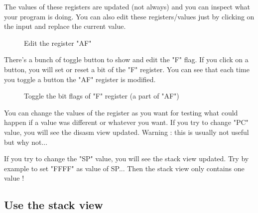 \documentclass[10pt]{report}
\begin{document}
The values of these registers are updated (not always) and you can inspect what your program is doing.\newline
You can also edit these registers/values just by clicking on the input and replace the current value.\newline
\begin{figure}[H]
\centering
{}
\caption{Edit the register "AF"}
\end{figure}

There's a bunch of toggle button to show and edit the "F" flag.\newline
If you click on a button, you will set or reset a bit of the "F" register.\newline
You can see that each time you toggle a button the "AF" register is modified.\newline
\begin{figure}[H]
\centering
{}
\caption{Toggle the bit flags of "F" register (a part of "AF")}
\end{figure}

You can change the values of the register as you want for testing what could happen if a value was different or whatever you want.\newline
If you try to change "PC" value, you will see the disasm view updated.\newline
Warning : this is usually not useful but why not...\newline

If you try to change the "SP" value, you will see the stack view updated.\newline
Try by example to set "FFFF" as value of SP... Then the stack view only contains one value !\newline

\subsection{Use the stack view}
\end{document}
